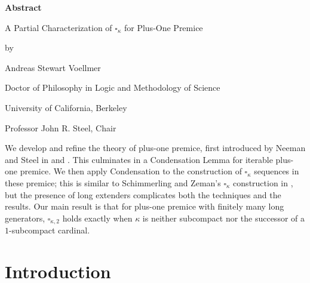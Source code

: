 \documentclass[12pt]{article}
\begin{document}
\newpage\null\newpage


\begin{center}

\textbf{Abstract}\\

\bigskip

A Partial Characterization of $\square_\kappa$ for Plus-One Premice\\

\smallskip

by\\

\smallskip

Andreas Stewart Voellmer\\

\smallskip

Doctor of Philosophy in Logic and Methodology of Science\\

\smallskip

University of California, Berkeley\\

\smallskip

Professor John R. Steel, Chair\\



\end{center}

\bigskip

We develop and refine the theory of plus-one premice, first introduced by Neeman and Steel in \cite{PIPM} and \cite{FSPIPM}.  This culminates in a Condensation Lemma for iterable plus-one premice.  We then apply Condensation to the construction of $\square_\kappa$ sequences in these premice; this is similar to Schimmerling and Zeman's $\square_\kappa$ construction in \cite{zeman square proof}, but the presence of long extenders complicates both the techniques and the results.  Our main result is that for plus-one premice with finitely many long generators, $\square_{\kappa , 2}$ holds exactly when $\kappa$ is neither subcompact nor the successor of a $1$-subcompact cardinal.

\newpage
{}
\tableofcontents

\newpage

\section{Introduction}
\end{document}
